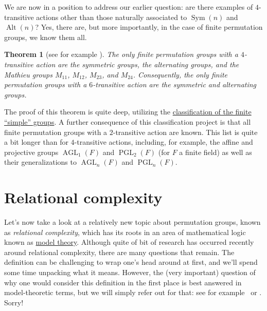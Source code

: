 \documentclass[11pt]{amsart}
\theoremstyle{plain}
\newtheorem*{theorem*}{Theorem}
\theoremstyle{definition}
\theoremstyle{remark}
\DeclareMathOperator{\Sym}{Sym}
\DeclareMathOperator{\Alt}{Alt}
\DeclareMathOperator{\AGL}{AGL}
\DeclareMathOperator{\PGL}{PGL}
\begin{document}
We are now in a position to address our earlier question: are there examples of $4$-transitive actions other than those naturally associated to $\Sym(n)$ and $\Alt(n)$? Yes, there are, but  more importantly, in the case of finite permutation groups, we know them all.

\begin{theorem*}[see for example {\cite[Theorem~4.11]{CaP99}}]
The only finite permutation groups with a $4$-transitive action are the symmetric groups, the alternating groups, and the Mathieu groups $M_{11}$, $M_{12}$, $M_{23}$, and $M_{24}$. Consequently, the only finite permutation groups with a $6$-transitive action are the symmetric and alternating groups.
\end{theorem*}

The proof of this theorem is quite deep, utilizing the \href{https://en.wikipedia.org/wiki/Classification_of_finite_simple_groups}{classification of the finite ``simple'' groups}. A further consequence of this classification project is that all finite permutation groups with a $2$-transitive action are known. This list is quite a bit longer than for $4$-transitive actions, including, for example, the affine and projective groups $\AGL_1(F)$ and $\PGL_2(F)$ (for $F$ a finite field) as well as their generalizations to $\AGL_n(F)$ and $\PGL_n(F)$. 


\section{Relational complexity}\label{S:rcomp}

Let's now take a look at a relatively new topic about permutation groups, known as \emph{relational complexity}, which has its roots in an area of mathematical logic known as \href{https://en.wikipedia.org/wiki/Model_theory}{model theory}. Although quite of bit of research has occurred recently around relational complexity, there are many questions that remain.
The definition can be challenging to wrap one's head around at first, and we'll spend some time unpacking what it means. However, the (very important) question of why one would consider this definition in the first place is best answered in model-theoretic terms, but we will simply refer out for that: see for example~\cite[Section~2]{ChG00} or \cite[Section~2.2]{WiJ16b}. Sorry!
\end{document}
